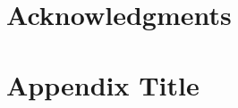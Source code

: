 \documentclass[11pt]{article}
\begin{document}
\section*{Acknowledgments}




\appendix

\section{Appendix Title}


\end{document}
